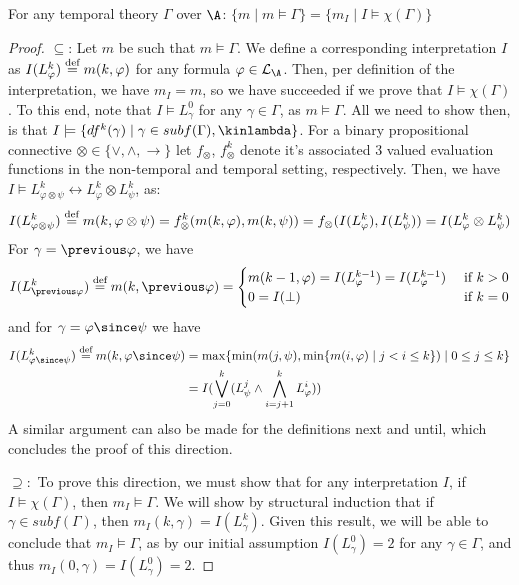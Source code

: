\begin{theorem}\label{theorem:translation}
For any temporal theory $\Gamma$ over $\A$: \quad
$\{ m \mid m \models \Gamma \} = \{ m_I \mid I \models \chi(\Gamma) \}$
\end{theorem}
\begin{proof}
  $\subseteq$: Let $m$ be such that $m \models \Gamma$. We define a
  corresponding interpretation $I$ as
  $I(L^k_\varphi) \stackrel{\text{def}}{=} m(k,\varphi)$ for any formula
  $\varphi \in \mathcal{L}_\A$. Then, per definition of the
  interpretation, we have $m_I=m$, so we have succeeded if we prove
  that $I \models \chi(\Gamma)$. To this end, note that
  $I \models L^0_\gamma$ for any $\gamma \in \Gamma$, as
  $m \models \Gamma$. All we need to show then, is that
  $I \models \{ df^k(\gamma) \mid \gamma \in subf(\Gamma), \kinlambda
  \}$. For a binary propositional connective
  $\otimes \in \{ \vee, \wedge, \rightarrow \}$ let $f_{\otimes}$,
  $f_{\otimes}^k$ denote it's associated 3 valued evaluation functions
  in the non-temporal and temporal setting, respectively. Then, we
  have
  $I \models L^k_{\varphi \otimes \psi} \leftrightarrow L^k_\varphi
  \otimes L^k_\psi$, as:
  $$
  I(L^k_{\varphi \otimes \psi}) \stackrel{\text{def}}{=} m(k,\varphi \otimes \psi) 
  = f_{\otimes}^k(m(k,\varphi),m(k,\psi)) = f_{\otimes}(I(L^k_\varphi),I(L^k_\psi)) = I(L^k_{\varphi} \otimes L^k_{\psi})
  $$
  For $\gamma=\previous \varphi$, we have
  $$
  I(L^k_{\previous \varphi}) \defeq m(k,\previous \varphi) = \begin{cases}
    m(k-1,\varphi)=I(L^{k-1}_\varphi)=I(L^{k-1}_\varphi) &\text{ if } k > 0\\
    0=I(\bot) &\text{ if } k = 0
    \end{cases}
  $$
  and for $\gamma=\varphi \since \psi$ we have
  \begin{align*}
  I(L^k_{\varphi \since \psi}) \defeq m(k,\varphi \since \psi) &= \max \{\min (m(j, \psi), \min \{m(i, \varphi) \mid j<i \leq k\}) \mid 0 \leq j \leq k\} \\
    &= I(\bigvee_{j=0}^{k}(L_\psi^j \wedge \bigwedge_{i=j+1}^{k}L_{\varphi}^i))
  \end{align*}
  A similar argument can also be made for the definitions next and
  until, which concludes the proof of this direction.

  $\supseteq:$ To prove this direction, we must show that for any
  interpretation $I$, if $I \models \chi(\Gamma)$, then
  $m_I \models \Gamma$. We will show by structural induction that if
  $\gamma \in subf(\Gamma)$, then $m_I(k,\gamma) = I(L^k_\gamma)$.
  Given this result, we will be able to conclude that
  $m_I \models \Gamma$, as by our initial assumption $I(L^0_\gamma)=2$
  for any $\gamma \in \Gamma$, and thus $m_I(0,\gamma)=I(L^0_\gamma)=2$.


\end{proof}
